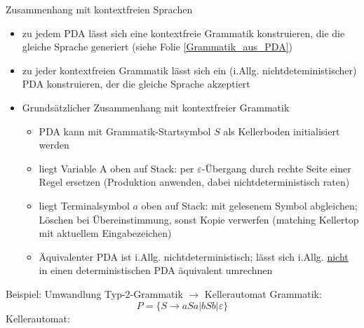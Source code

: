 \begin{frame}{Zusammenhang mit kontextfreien Sprachen}
	\begin{itemize}
		\item zu jedem PDA lässt sich eine kontextfreie Grammatik konstruieren, die die gleiche Sprache generiert (siehe Folie \ref{Grammatik_aus_PDA})
		\item zu jeder kontextfreien Grammatik lässt sich ein (i.Allg. nichtdeteministischer) PDA konstruieren, der die gleiche Sprache akzeptiert
		\item Grundsätzlicher Zusammenhang mit kontextfreier Grammatik
		\begin{itemize}
			\item PDA kann mit Grammatik-Startsymbol $S$ als Kellerboden initialisiert werden
			\item liegt Variable A oben auf Stack: per $\varepsilon$-Übergang durch rechte Seite einer Regel ersetzen (Produktion anwenden, dabei nichtdeterministisch raten)
			\item liegt Terminalsymbol $a$ oben auf Stack: mit gelesenem Symbol abgleichen; Löschen bei Übereinstimmung, sonst Kopie verwerfen (matching Kellertop mit aktuellem Eingabezeichen)
			\item Äquivalenter PDA ist i.Allg. nichtdeterministisch; lässt sich i.Allg. \underline{nicht} in einen deterministischen PDA äquivalent umrechnen
		\end{itemize}
	\end{itemize}
\end{frame}


\begin{frame}{Beispiel: Umwandlung Typ-2-Grammatik $\rightarrow$ Kellerautomat}
	Grammatik: $$P=\{S\rightarrow aSa|bSb|\varepsilon\}$$
	Kellerautomat:\\
	\centering
\end{frame}

